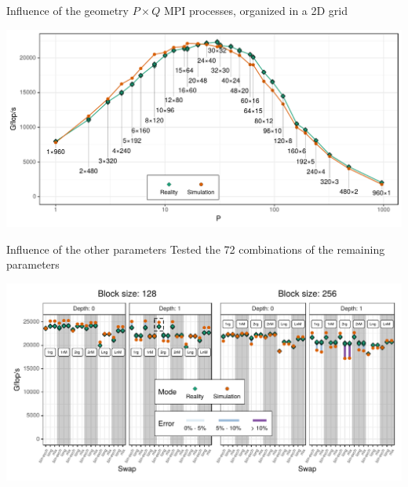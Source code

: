 \documentclass[10pt]{beamer}
\begin{document}
\begin{frame}{Influence of the geometry}
    \(P \times Q\) MPI processes, organized in a 2D grid

    \begin{center}
        \includegraphics[width=0.9\linewidth]{img/slides/validation_geometry.pdf}
    \end{center}
\end{frame}

\begin{frame}{Influence of the other parameters}
    Tested the 72 combinations of the remaining parameters
    \begin{center}
        \includegraphics[width=0.9\linewidth]{img/prediction/validation/factorial/validation_factorial.pdf}
    \end{center}
\end{frame}
\end{document}
